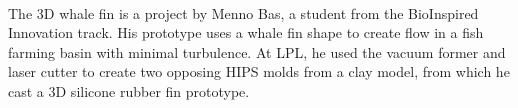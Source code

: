 \documentclass{report}
\begin{document}
\clearpage
\begin{figure}
    \centering
\end{figure}
\clearpage

 \\

The 3D whale fin is a project by Menno Bas, a student from the
BioInspired Innovation track. His prototype uses a whale fin shape to
create flow in a fish farming basin with minimal turbulence. At LPL, he
used the vacuum former and laser cutter to create two opposing HIPS
molds from a clay model, from which he cast a 3D silicone rubber fin
prototype.

\clearpage
\begin{figure}
    \centering
\end{figure}
\clearpage

 \\
\end{document}
